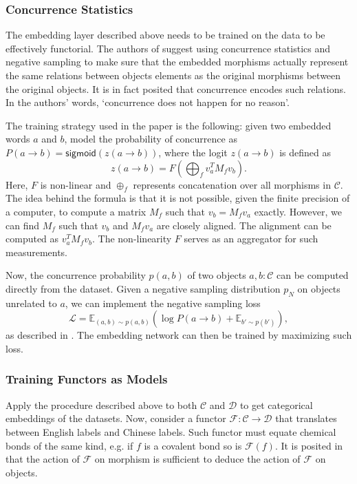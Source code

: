 \documentclass[11pt,a4paper,openright,twoside]{report}
\theoremstyle{plain}
\theoremstyle{definition}
\begin{document}
\subsubsection{Concurrence Statistics}

The embedding layer described above needs to be trained on the data to be effectively functorial. The authors of \cite{sheshmani2021categorical} suggest using concurrence statistics and negative sampling to make sure that the embedded morphisms actually represent the same relations between objects elements as the original morphisms between the original objects. It is in fact posited that concurrence encodes such relations. In the authors' words, \lq  concurrence does not happen for no reason\rq.


The training strategy used in the paper is the following: given two embedded words $a$ and $b$, model the probability of concurrence as $P(a \to b) = \mathsf{sigmoid}(z(a \to b))$, where the logit $z(a \to b)$ is defined as
\[z(a \to b) = F\left(\bigoplus_f v_a^TM_fv_b \right).\]
Here, $F$ is non-linear and $\oplus_f$ represents concatenation over all morphisms in $\mathcal{C}$. The idea behind the formula is that it is not possible, given the finite precision of a computer, to compute a matrix $M_f$ such that $v_b = M_fv_a$ exactly. However, we can find $M_f$ such that $v_b$ and $M_fv_a$ are closely aligned. The alignment can be computed as $v_a^TM_fv_b$. The non-linearity $F$ serves as an aggregator for such measurements.


Now, the concurrence probability $p(a,b)$ of two objects $a,b : \mathcal{C}$ can be computed directly from the dataset. Given a negative sampling distribution $p_N$ on objects unrelated to $a$, we can implement the negative sampling loss
\[\mathcal{L} = \mathbb{E}_{(a,b) \sim p(a,b)}\left(\log P(a \to b) + \mathbb{E}_{b' \sim p(b')}\right),\]
as described in \cite{sheshmani2021categorical}. The embedding network can then be trained by maximizing such loss.


\subsubsection{Training Functors as Models}

Apply the procedure described above to both $\mathcal{C}$ and $\mathcal{D}$ to get categorical embeddings of the datasets. Now, consider a functor $\mathcal{F}: \mathcal{C} \to \mathcal{D}$ that translates between English labels and Chinese labels. Such functor must equate chemical bonds of the same kind, e.g. if $f$ is a covalent bond so is $\mathcal{F}(f)$. It is posited in \cite{sheshmani2021categorical} that the action of $\mathcal{F}$ on morphism is sufficient to deduce the action of $\mathcal{F}$ on objects.
\end{document}
